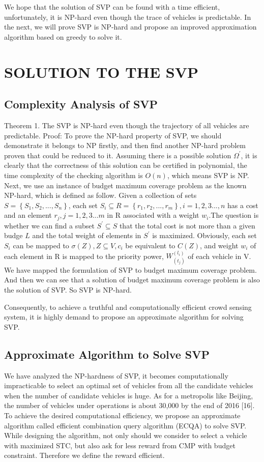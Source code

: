 \documentclass[journal]{IEEEtran}
\begin{document}
We hope that the solution of SVP can be found with a time efficient, unfortunately, it is NP-hard even though the trace of vehicles is predictable. In the next, we will prove SVP is NP-hard and propose an improved approximation algorithm based on greedy to solve it.
\section{SOLUTION TO THE SVP}
\subsection{Complexity Analysis of SVP}
Theorem 1. The SVP is NP-hard even though the trajectory of all vehicles are predictable.
Proof: To prove the NP-hard property of SVP, we should demonstrate it belongs to NP firstly, and then find another NP-hard problem proven that could be reduced to it. Assuming there is a possible solution $\Omega^{'}$, it is clearly that the correctness of this solution can be certified in polynomial, the time complexity of the checking algorithm is $O(n)$, which means SVP is NP. Next, we use an instance of budget maximum coverage problem as the known NP-hard, which is defined as follow. Given a collection of sets $S=\left \{S_{1},S_{2},...,S_{n}\right \}$, each set $S_{i}\subseteq R=\left \{ r_{1},r_{2},...,r_{m} \right \},i=1,2,3...,n$ has a cost  and an element $r_{j},j=1,2,3...m$ in R associated with a weight $w_{i}$.The question is whether we can find a subset  $S^{'}\subseteq S$ that the total cost is not more than a given budge $L$ and the total weight of elements in $S^{'}$ is maximized. Obviously, each set $S_{i}$ can be mapped to $\sigma(Z),Z\subseteq V,c_{i}$ be equivalent to $C(Z)$, and weight $w_{i}$ of each element in R is mapped to the priority power, $W_(t_{j})^(l_{i})$ of each vehicle in V. We have mapped the formulation of SVP to budget maximum coverage problem. And then we can see that a solution of budget maximum coverage problem is also the solution of SVP. So SVP is NP-hard.

Consequently, to achieve a truthful and computationally efficient crowd sensing system, it is highly demand to propose an approximate algorithm for solving SVP.
\subsection{Approximate Algorithm to Solve SVP}
We have analyzed the NP-hardness of SVP, it becomes computationally impracticable to select an optimal set of vehicles from all the candidate vehicles when the number of candidate vehicles is huge. As for a metropolis like Beijing, the number of vehicles under operations is about 30,000 by the end of 2016 [16]. To achieve the desired computational efficiency, we propose an approximate algorithm called efficient combination query algorithm (ECQA) to solve SVP. While designing the algorithm, not only should we consider to select a vehicle with maximized STC, but also ask for less reward from CMP with budget constraint. Therefore we define the reward efficient.
\end{document}
